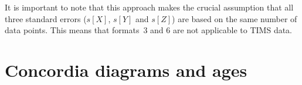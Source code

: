 \begin{refsection}
It is important to note that this approach makes the crucial
assumption that all three standard errors ($s[X]$, $s[Y]$ and $s[Z]$)
are based on the same number of data points. This means that formats~3
and 6 are not applicable to TIMS data.

\section{Concordia diagrams and ages}
\label{sec:concordia}

\printbibliography[heading=subbibliography]

\end{refsection}
